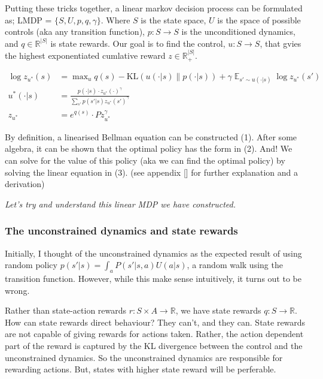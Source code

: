 
Putting these tricks together, a linear markov decision process can be formulated as;
LMDP = $\{S, U, p, q, \gamma\}$. Where $S$ is the state space, $U$ is the space of possible controls (aka any transition function),
$p: S \to S$ is the unconditioned dynamics, and $q \in \mathbb R^{|S|}$ is state rewards.
Our goal is to find the control, $u: S \to S$, that gvies the highest exponentiated cumlative reward $z \in \mathbb R_+^{|S|}$.

\begin{align}
\log z_{u^{* }}(s) &= \mathop{\text{max}}_{u} q(s) - \text{KL}(u(\cdot| s) \parallel p(\cdot | s)) + \gamma \mathop{\mathbb E}_{s' \sim u(\cdot | s)} \log z_{u^{* }}(s') \tag{1}\\
u^{* }(\cdot | s) &= \frac{p(\cdot | s)\cdot z_{u^{* }}(\cdot)^{\gamma}}{\sum_{s'} p(s' | s) z_{u^{* }}(s')^{\gamma}} \tag{2}\\
z_{u^{* }} &= e^{q(s)}\cdot P z_{u^{* }}^{\gamma} \tag{3}
\end{align}

By definition, a linearised Bellman equation can be constructed (1). After some algebra,
it can be shown that the optimal policy has the form in (2).
And! We can solve for the value of this policy (aka we can find the optimal policy)
by solving the linear equation in (3). (see appendix [] for further explanation and a derivation)

\begin{displayquote}
\textit{Let's try and understand this linear MDP we have constructed.}
\end{displayquote}

\subsubsection{\color{red}The unconstrained dynamics and state rewards}

Initially, I thought of the unconstrained dynamics as the expected result of using random policy
$p(s' | s) = \int_a P(s' | s, a)U(a|s)$, a random walk using the transition function.
However, while this make sense intuitively, it turns out to be wrong.

Rather than state-action rewards $r: S \times A \to \mathbb R$, we have state rewards $q: S \to \mathbb R$.
How can state rewards direct behaviour? They can't, and they can. State rewards are not capable of giving rewards for actions taken.
Rather, the action dependent part of the reward is captured by the KL divergence between the control and the unconstrained dynamics.
So the unconstrained dynamics are responsible for rewarding actions.
But, states with higher state reward will be perferable.


